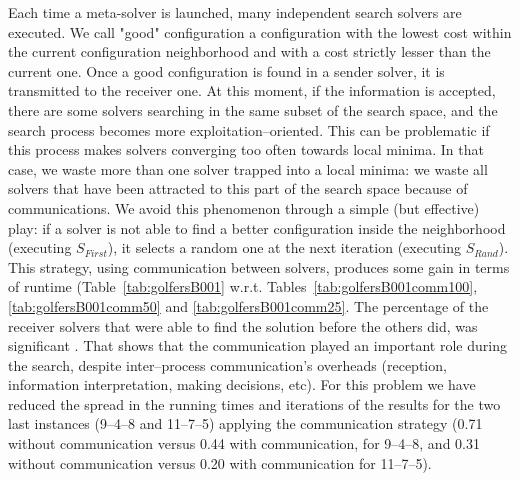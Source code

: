 Each time a \posl{} meta-solver is launched, many independent search solvers are executed. We call "good" configuration a configuration with the lowest cost within the current configuration neighborhood and with a cost strictly lesser than the current one. Once a good configuration is found in a sender solver, it is transmitted to the receiver one. At this moment, if the information is accepted, there are some solvers searching in the same subset of the search space, and the search process becomes more exploitation--oriented. This can be problematic if this process makes solvers converging too often towards local minima. In that case, we waste more than one solver trapped into a local minima: we waste all solvers that have been attracted to this part of the search space because of communications. We avoid this phenomenon through a simple (but effective) play: if a solver is not able to find a better configuration inside the neighborhood (executing $S_{First}$), it selects a random one at the next iteration (executing $S_{Rand}$). This strategy, using communication between solvers, produces some gain in terms of runtime (Table~\ref{tab:golfersB001} w.r.t. Tables~\ref{tab:golfersB001comm100}, \ref{tab:golfersB001comm50} and \ref{tab:golfersB001comm25}. The percentage of the receiver solvers that were able to find the solution before the others did, was significant . %
That shows that the communication played an important role during the search, despite inter--process communication's overheads (reception, information interpretation, making decisions, etc). For this problem we have reduced the spread in the running times and iterations of the results for the two last instances (9--4--8 and 11--7--5) applying the communication strategy (0.71 without communication versus 0.44 with communication, for 9--4--8, and 0.31 without communication versus 0.20 with communication for 11--7--5). %

\section{\nqp}

